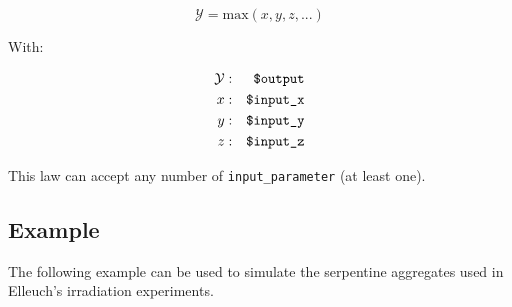 \documentclass[10pt]{article}
\begin{document}
\begin{equation}
	\mathcal{Y} = \mathrm{max}( x,y,z,... )
\end{equation}

With:

\begin{eqnarray}
	\mathcal{Y} & : & \verb+$output+ \notag \\
	x & : & \verb+$input_x+ \notag \\
	y & : & \verb+$input_y+ \notag \\
	z & : & \verb+$input_z+ \notag 
\end{eqnarray}

This law can accept any number of \verb+input_parameter+ (at least one).

\subsection{Example}

The following example can be used to simulate the serpentine aggregates used in Elleuch's irradiation experiments.\\
\end{document}
